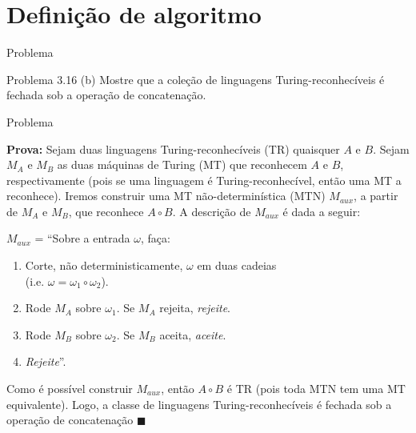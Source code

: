\documentclass[xcolor=dvipsnames,table]{beamer}
\begin{document}
	\section{Definição de algoritmo}
	\begin{frame}{Problema}
		\begin{block}{Problema 3.16 (b)}
			Mostre que a coleção de linguagens Turing-reconhecíveis é fechada sob a operação de concatenação.		
		\end{block}
	\end{frame}

	\begin{frame}{Problema} 
		
			{\bf Prova:} Sejam duas linguagens Turing-reconhecíveis (TR) quaisquer $A$ e $B$. \pause Sejam $M_A$ e $M_B$ as duas máquinas de Turing (MT) que reconhecem $A$ e $B$, respectivamente \pause (pois se uma linguagem é Turing-reconhecível, então uma MT a reconhece). \pause Iremos construir uma MT não-determinística (MTN) $M_{aux}$, a partir de $M_A$ e $M_B$, que reconhece $A \circ B$. \pause A descrição de $M_{aux}$ é dada a seguir: \pause
			
			$M_{aux}$ = ``Sobre a entrada $\omega$, faça: \pause
			\begin{enumerate}
				\item Corte, não deterministicamente, $\omega$ em duas cadeias \\(i.e. $\omega = \omega_1 \circ \omega_2$). \pause
				\item Rode $M_A$ sobre $\omega_1$. Se $M_A$ rejeita, {\it rejeite}. \pause
				\item Rode $M_B$ sobre $\omega_2$. Se $M_B$ aceita, {\it aceite}. \pause
				\item {\it Rejeite}''.
			\end{enumerate} \pause
			
			Como é possível construir $M_{aux}$, então $A \circ B$ é TR \pause (pois toda MTN tem uma MT equivalente). \pause Logo, a classe de linguagens Turing-reconhecíveis é fechada sob a operação de concatenação $\blacksquare$
	\end{frame}
\end{document}
